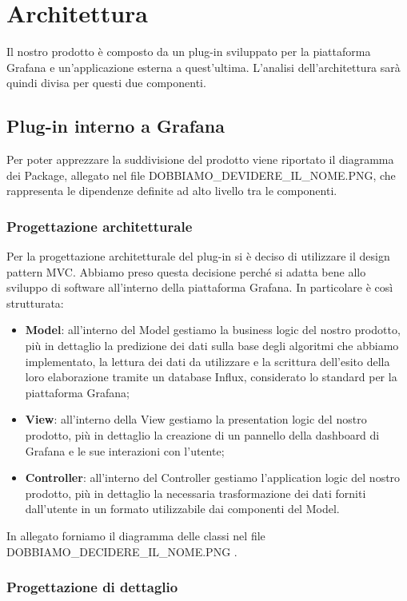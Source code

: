 \section{Architettura}
	Il nostro prodotto è composto da un plug-in sviluppato per la piattaforma Grafana e un'applicazione esterna a quest'ultima. L'analisi dell'architettura sarà quindi divisa per questi due componenti.
	\subsection{Plug-in interno a Grafana}
		Per poter apprezzare la suddivisione del prodotto viene riportato il diagramma dei Package, allegato nel file DOBBIAMO_DEVIDERE_IL_NOME.PNG, che rappresenta le dipendenze definite ad alto livello tra le componenti.
		\subsubsection{Progettazione architetturale}
		Per la progettazione architetturale del plug-in si è deciso di utilizzare il design pattern MVC. Abbiamo preso questa decisione perché si adatta bene allo sviluppo di software all'interno della piattaforma Grafana. In particolare è così strutturata:
		\begin{itemize}
			\item \textbf{Model}: all'interno del Model gestiamo la business logic del nostro prodotto, più in dettaglio la predizione dei dati sulla base degli algoritmi che abbiamo implementato, la lettura dei dati da utilizzare e la scrittura dell'esito della loro elaborazione tramite un database Influx, considerato lo standard per la piattaforma Grafana;
			\item \textbf{View}: all'interno della View gestiamo la presentation logic del nostro prodotto, più in dettaglio la creazione di un pannello della dashboard di Grafana e le sue interazioni con l'utente;
			\item \textbf{Controller}: all'interno del Controller gestiamo l'application logic del nostro prodotto, più in dettaglio la necessaria trasformazione dei dati forniti dall'utente in un formato utilizzabile dai componenti del Model.
		\end{itemize}
		In allegato forniamo il diagramma delle classi nel file DOBBIAMO_DECIDERE_IL_NOME.PNG .
		\subsubsection{Progettazione di dettaglio}
